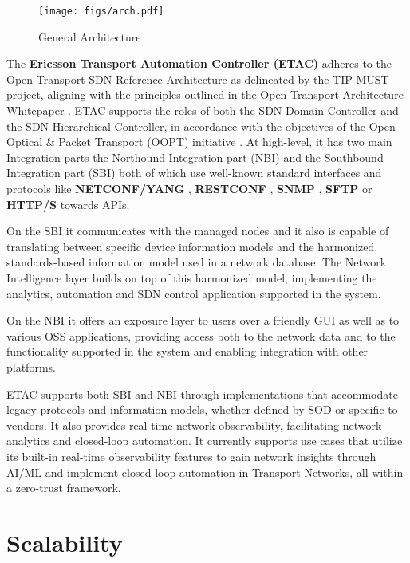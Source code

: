 \documentclass[10pt,sigconf]{iabart}
\begin{document}
\begin{figure}[h]
  \centering
  \texttt{[image: figs/arch.pdf]}
  \caption{General Architecture}
  \label{fig:overall_architecture}
\end{figure}

The \textbf{Ericsson Transport Automation Controller (ETAC)} \cite{ericsson-etac} adheres to the Open Transport SDN Reference Architecture as delineated by the TIP MUST project, aligning with the principles outlined in the Open Transport Architecture Whitepaper \cite{open_transport_architecture_whitepaper}. ETAC supports the roles of both the SDN Domain Controller and the SDN Hierarchical Controller, in accordance with the objectives of the Open Optical \& Packet Transport (OOPT) initiative \cite{oopt}. At high-level, it has two main Integration parts the Northound Integration part (NBI) and the Southbound Integration part (SBI) both of which use well-known standard interfaces and protocols like \textbf{NETCONF/YANG} \cite{RFC6241, rfc6020}, \textbf{RESTCONF} \cite{RFC8040}, \textbf{SNMP} \cite{RFC1157}, \textbf{SFTP} \cite{RFC4253} or \textbf{HTTP/S} \cite{RFC7230} towards APIs.

On the SBI it communicates with the managed nodes and it also is capable of translating between specific device information models and the harmonized, standards-based information model used in a network database. The Network Intelligence layer builds on top of this harmonized model, implementing the analytics, automation and SDN control application supported in the system. 

On the NBI it offers an exposure layer to users over a friendly GUI as well as to various OSS applications, providing access both to the network data and to the functionality supported in the system and enabling integration with other platforms. 

ETAC supports both SBI and NBI through implementations that accommodate legacy protocols and information models, whether defined by SOD or specific to vendors. It also provides real-time network observability, facilitating network analytics and closed-loop automation. It currently supports use cases that utilize its built-in real-time observability features to gain network insights through AI/ML and implement closed-loop automation in Transport Networks, all within a zero-trust framework.

\section{Scalability} \label{scalability}
\end{document}
